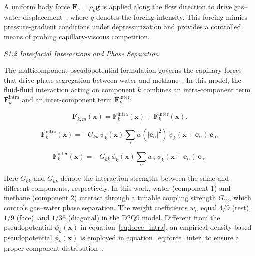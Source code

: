 \documentclass[draft,wrr]{agutexSI2019}
\begin{document}
\begin{article}
A uniform body force $\mathbf{F}_b = \rho_k \mathbf{g}$ is applied along the
flow direction to drive gas--water displacement~\cite{ji_relative_2022}, where $g$ denotes the forcing
intensity. This forcing mimics pressure-gradient conditions under depressurization
and provides a controlled means of probing capillary-viscous competition.

\noindent\textit{S1.2 Interfacial Interactions and Phase Separation}

The multicomponent pseudopotential formulation governs the capillary forces that
drive phase segregation between water and methane~\cite{chen_critical_2014}.
In this model, the fluid-fluid interaction acting on component $k$ combines an
intra-component term $\mathbf{F}_k^{\mathrm{intra}}$ and an inter-component term
$\mathbf{F}_k^{\mathrm{inter}}$:
\begin{linenomath*}
\begin{equation}
\label{eq:force_total}
\mathbf{F}_{k,m}(\mathbf{x})
=
\mathbf{F}_k^{\mathrm{intra}}(\mathbf{x})
+
\mathbf{F}_k^{\mathrm{inter}}(\mathbf{x}) .
\end{equation}
\end{linenomath*}

\begin{linenomath*}
\begin{equation}
\label{eq:force_intra}
\mathbf{F}_k^{\mathrm{intra}}(\mathbf{x})
=
-
G_{kk}
\,
\psi_k(\mathbf{x})
\sum_{\alpha}
w(|\mathbf{e}_\alpha|^2)
\,
\psi_k(\mathbf{x}+\mathbf{e}_\alpha)
\,
\mathbf{e}_\alpha .
\end{equation}
\end{linenomath*}

\begin{linenomath*}
\begin{equation}
\label{eq:force_inter}
\mathbf{F}_k^{\mathrm{inter}}(\mathbf{x})
=
-
G_{k\bar{k}}
\,
\phi_k(\mathbf{x})
\sum_{\alpha}
w_\alpha
\,
\phi_{\bar{k}}(\mathbf{x}+\mathbf{e}_\alpha)
\,
\mathbf{e}_\alpha .
\end{equation}
\end{linenomath*}
Here $G_{kk}$ and $G_{k\bar{k}}$ denote the interaction strengths between the
same and different components, respectively. In this work, water (component 1)
and methane (component 2) interact through a tunable coupling strength $G_{12}$,
which controls gas--water phase separation. The weight coefficients $w_\alpha$
equal $4/9$ (rest), $1/9$ (face), and $1/36$ (diagonal) in the D2Q9 model.
Different from the pseudopotential  $\psi_k(\mathbf{x})$ in equation~\eqref{eq:force_intra},
an empirical density-based pseudopotential $\phi_k(\mathbf{x})$ is employed
in equation~\eqref{eq:force_inter} to ensure a proper component distribution~\cite{zheng_single_2019}.


\end{article}
\end{document}
